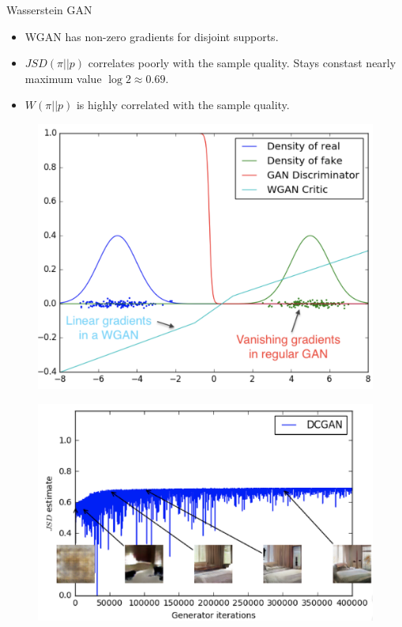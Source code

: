\begin{frame}{Wasserstein GAN}
	\begin{minipage}[t]{0.6\columnwidth}
		\begin{itemize}
			\item WGAN has non-zero gradients for disjoint supports.
			\item $JSD(\pi || p)$ correlates poorly with the sample quality. Stays constast nearly maximum value $\log 2 \approx 0.69$.
			\item $W(\pi || p)$ is highly correlated with the sample quality. 
		\end{itemize}
	\end{minipage}%
	\begin{minipage}[t]{0.4\columnwidth}
		\begin{figure}
			\centering
			\includegraphics[width=\linewidth]{figs/wgan_toy}
		\end{figure}
	\end{minipage}
	\begin{minipage}[t]{0.5\columnwidth}
		\begin{figure}
			\centering
			\includegraphics[width=1.0\linewidth]{figs/dcgan_quality}

\end{figure}
\end{minipage}
\end{frame}
